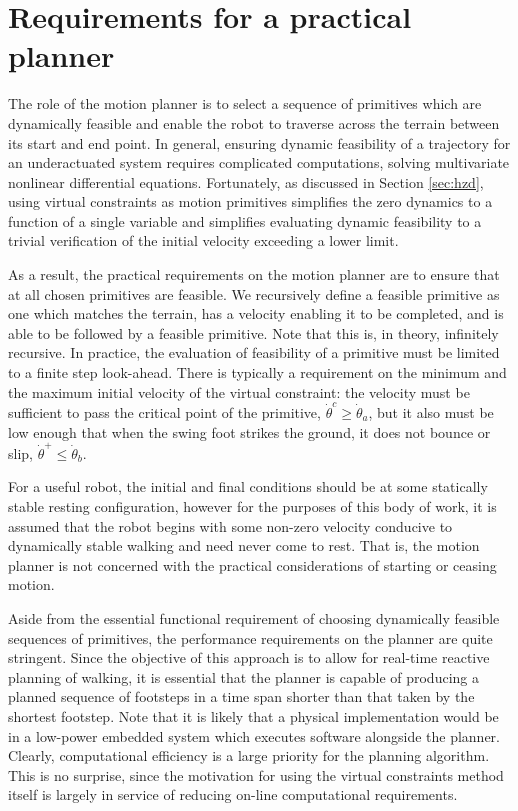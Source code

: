 \section{Requirements for a practical planner}
The role of the motion planner is to select a sequence of primitives which are dynamically feasible and enable the robot to traverse across the terrain between its start and end point. In general, ensuring dynamic feasibility of a trajectory for an underactuated system requires complicated computations, solving multivariate nonlinear differential equations. Fortunately, as discussed in Section \ref{sec:hzd}, using virtual constraints as motion primitives simplifies the zero dynamics to a function of a single variable and simplifies evaluating dynamic feasibility to a trivial verification of the initial velocity exceeding a lower limit.

As a result, the practical requirements on the motion planner are to ensure that at all chosen primitives are feasible. We recursively define a feasible primitive as one which matches the terrain, has a velocity enabling it to be completed, and is able to be followed by a feasible primitive. Note that this is, in theory, infinitely recursive. In practice, the evaluation of feasibility of a primitive must be limited to a finite step look-ahead. There is typically a requirement on the minimum and the maximum initial velocity of the virtual constraint: the velocity must be sufficient to pass the critical point of the primitive, $\dot{\theta}^c \geq \dot{\theta}_a$, but it also must be low enough that when the swing foot strikes the ground, it does not bounce or slip, $\dot{\theta}^+ \leq \dot{\theta}_b$.

For a useful robot, the initial and final conditions should be at some statically stable resting configuration, however for the purposes of this body of work, it is assumed that the robot begins with some non-zero velocity conducive to dynamically stable walking and need never come to rest. That is, the motion planner is not concerned with the practical considerations of starting or ceasing motion.

Aside from the essential functional requirement of choosing dynamically feasible sequences of primitives, the performance requirements on the planner are quite stringent. Since the objective of this approach is to allow for real-time reactive planning of walking, it is essential that the planner is capable of producing a planned sequence of footsteps in a time span shorter than that taken by the shortest footstep. Note that it is likely that a physical implementation would be in a low-power embedded system which executes software alongside the planner. Clearly, computational efficiency is a large priority for the planning algorithm. This is no surprise, since the motivation for using the virtual constraints method itself is largely in service of reducing on-line computational requirements.

